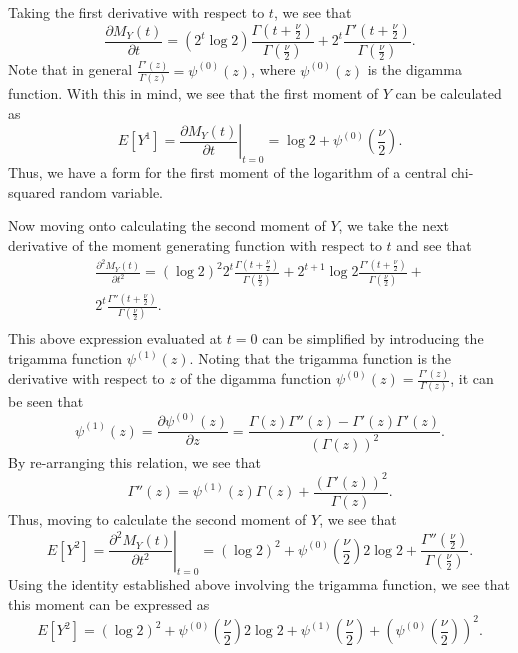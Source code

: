 Taking the first derivative with respect to $t$, we see that
\begin{equation*}
	\frac{\partial M_Y(t)}{\partial t} = (2^t \log 2) \frac{\Gamma (t + \frac{\nu}{2})}{\Gamma (\frac{\nu}{2})} + 2^t \frac{\Gamma ' (t + \frac{\nu}{2})}{\Gamma (\frac{\nu}{2})} .
\end{equation*}
Note that in general $\frac{\Gamma ' (z)}{\Gamma (z)} = \psi^{(0)}(z)$, where $\psi^{(0)}(z)$ is the digamma function. With this in mind, we see that the first moment of
$Y$ can be calculated as
\begin{equation*}
	E \left[ Y^1 \right] =  \left. \frac{\partial M_Y(t)}{\partial t} \right|_{t=0} = \log 2 + \psi^{(0)} \left( \frac{\nu}{2} \right) .
\end{equation*}
Thus, we have a form for the first moment of the logarithm of a central chi-squared random variable.

Now moving onto calculating the second moment of $Y$, we take the next derivative of the moment generating function with respect to $t$ and see that
\begin{equation*}
	\begin{split}
		\frac{\partial^2 M_Y(t)}{\partial t^2} = (\log 2)^2 2^t  \frac{\Gamma (t + \frac{\nu}{2})}{\Gamma (\frac{\nu}{2})} + 2^{t+1} \log 2 \frac{\Gamma ' (t + \frac{\nu}{2})}{\Gamma (\frac{\nu}{2})} + \\ 
		2^t \frac{\Gamma '' (t + \frac{\nu}{2})}{\Gamma (\frac{\nu}{2})} .\\
	\end{split}
\end{equation*}
This above expression evaluated at $t = 0$ can be simplified by introducing the trigamma function $ \psi^{(1)}(z)$. Noting that the trigamma function is the derivative with respect
to $z$ of the digamma function $\psi^{(0)}(z) = \frac{\Gamma ' (z)}{\Gamma (z)}$, it can be seen that
\begin{equation*}
	\psi^{(1)}(z) = \frac{\partial \psi^{(0)}(z)}{\partial z} = \frac{\Gamma (z) \Gamma '' (z) - \Gamma '(z) \Gamma '(z)}{(\Gamma(z))^2} .
\end{equation*}
By re-arranging this relation, we see that
\begin{equation*}
	\Gamma ''(z) = \psi^{(1)}(z) \Gamma(z) + \frac{(\Gamma '(z))^2}{\Gamma(z)} .
\end{equation*}
Thus, moving to calculate the second moment of $Y$, we see that
\begin{equation*}
	E \left[ Y^2 \right] =  \left. \frac{\partial^2 M_Y(t)}{\partial t^2} \right|_{t=0} =
	(\log 2)^2 + \psi^{(0)} \left( \frac{\nu}{2} \right) 2 \log 2  + \frac{\Gamma '' (\frac{\nu}{2})}{\Gamma (\frac{\nu}{2})} .
\end{equation*}
Using the identity established above involving the trigamma function, we see that this moment can be expressed as
\begin{equation*}
	E \left[ Y^2 \right] =
	(\log 2)^2 + \psi^{(0)} \left( \frac{\nu}{2} \right) 2 \log 2  + \psi^{(1)} \left( \frac{\nu}{2} \right) + \left( \psi^{(0)} \left( \frac{\nu}{2} \right) \right)^2 .
\end{equation*}

